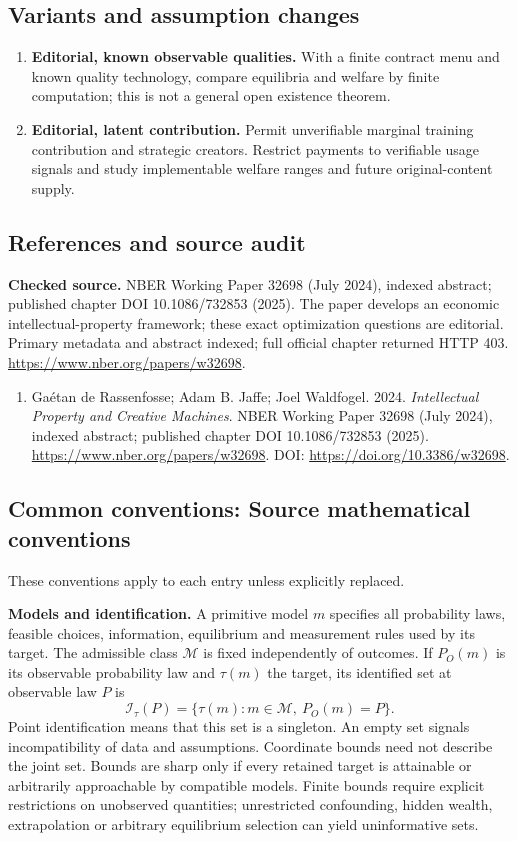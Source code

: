 \documentclass[11pt,a4paper]{article}
\begin{document}
\subsection*{Variants and assumption changes}
\begin{enumerate}
\item \textbf{Editorial, known observable qualities.} With a finite contract menu and known quality technology, compare equilibria and welfare by finite computation; this is not a general open existence theorem.
\item \textbf{Editorial, latent contribution.} Permit unverifiable marginal training contribution and strategic creators. Restrict payments to verifiable usage signals and study implementable welfare ranges and future original-content supply.
\end{enumerate}
\subsection*{References and source audit}
\textbf{Checked source.} NBER Working Paper 32698 (July 2024), indexed abstract; published chapter DOI 10.1086/732853 (2025). The paper develops an economic intellectual-property framework; these exact optimization questions are editorial. Primary metadata and abstract indexed; full official chapter returned HTTP 403. \url{https://www.nber.org/papers/w32698}.
\begin{enumerate}\raggedright
\item\hypertarget{definitions:source:30007697:1}{} Gaétan de Rassenfosse; Adam B. Jaffe; Joel Waldfogel. 2024. \emph{Intellectual Property and Creative Machines}. NBER Working Paper 32698 (July 2024), indexed abstract; published chapter DOI 10.1086/732853 (2025).
\url{https://www.nber.org/papers/w32698}.
DOI: \url{https://doi.org/10.3386/w32698}.
\end{enumerate}

\subsection*{Common conventions: Source mathematical conventions}

These conventions apply to each entry unless explicitly replaced.

\textbf{Models and identification.} A primitive model \(m\) specifies all probability laws, feasible choices, information, equilibrium and measurement rules used by its target. The admissible class \(\mathcal M\) is fixed independently of outcomes. If \(P_O(m)\) is its observable probability law and \(\tau(m)\) the target, its identified set at observable law \(P\) is
\[
 \mathcal I_\tau(P)=\{\tau(m):m\in\mathcal M,\ P_O(m)=P\}.
\]
Point identification means that this set is a singleton. An empty set signals incompatibility of data and assumptions. Coordinate bounds need not describe the joint set. Bounds are sharp only if every retained target is attainable or arbitrarily approachable by compatible models. Finite bounds require explicit restrictions on unobserved quantities; unrestricted confounding, hidden wealth, extrapolation or arbitrary equilibrium selection can yield uninformative sets.
\end{document}
